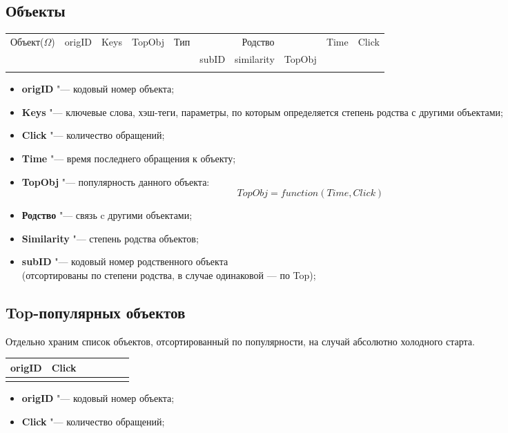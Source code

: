 \documentclass[a4paper,14pt]{article}
\begin{document}
\subsection{Объекты}\label{obj}
\begin{center}
\begin{tabular}[t]{|c|c|c|c|c|c|c|c|c|c|}
\hline
 Объект($\Omega$) & origID & Keys & TopObj & Тип &\multicolumn{3}{|c|}{Родство} & Time & Click \\\cline{6-8}
   &  && && subID & similarity &  TopObj & & \\
\hline  
 &  &  & &&  &  & &&\\ 
\end{tabular}
\end{center}
\begin{itemize}
\item {\bf origID} "--- кодовый номер объекта;
\item {\bf Keys }"--- ключевые слова, хэш-теги, параметры, по которым определяется степень родства с другими объектами;
\item {\bf Click }"--- количество обращений;
\item {\bf Time }"--- время последнего обращения к объекту;
\item {\bf TopObj} "--- популярность данного объекта:
\[TopObj = function(Time,Click)\]
\item {\bf Родство} "--- связь c другими объектами;
\item {\bf Similarity} "--- степень родства объектов;
\item {\bf subID} "--- кодовый номер родственного объекта \\(отсортированы по степени родства, в случае одинаковой --- по Top);
\end{itemize}

\subsection{Top-популярных объектов}\label{pop}
Отдельно храним список объектов, отсортированный по популярности, на случай абсолютно холодного старта.
\begin{center}
\begin{tabular}[t]{|c|c|c|c|c|c|c|}
\hline
 origID & Click \\
\hline  
 &   \\ 
\end{tabular}
\end{center}
\begin{itemize}
\item {\bf origID} "--- кодовый номер объекта;
\item {\bf Click} "--- количество обращений;
\end{itemize}
\end{document}
